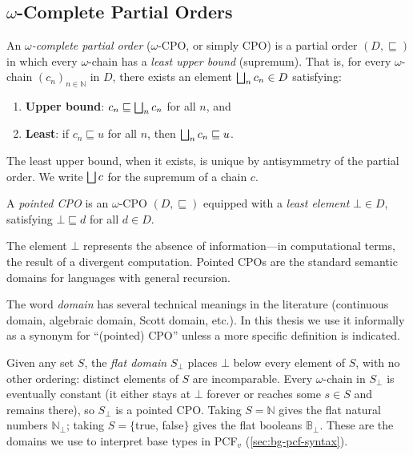 \subsection{$\omega$-Complete Partial Orders}
\label{sec:bg-cpo}

\begin{definition}
\label{def:omega-cpo}
An \emph{$\omega$-complete partial order} ($\omega$-CPO, or simply CPO)
is a partial order $(D, \sqsubseteq)$ in which every $\omega$-chain has
a \emph{least upper bound} (supremum). That is, for every $\omega$-chain
$(c_n)_{n \in \mathbb{N}}$ in $D$, there exists an element
$\bigsqcup_n c_n \in D$ satisfying:
\begin{enumerate}
  \item \textbf{Upper bound}: $c_n \sqsubseteq \bigsqcup_n c_n$ for all $n$, and
  \item \textbf{Least}: if $c_n \sqsubseteq u$ for all $n$, then
        $\bigsqcup_n c_n \sqsubseteq u$.
\end{enumerate}
\end{definition}

The least upper bound, when it exists, is unique by antisymmetry of the
partial order. We write $\bigsqcup c$ for the supremum of a chain $c$.

\begin{definition}
\label{def:pointed-cpo}
A \emph{pointed CPO} is an $\omega$-CPO $(D, \sqsubseteq)$ equipped with a
\emph{least element} $\bot \in D$, satisfying $\bot \sqsubseteq d$ for all
$d \in D$.
\end{definition}

The element $\bot$ represents the absence of information---in
computational terms, the result of a divergent computation. Pointed CPOs
are the standard semantic domains for languages with general recursion.

\begin{remark}
\label{rem:domain}
The word \emph{domain} has several technical meanings in the literature
(continuous domain, algebraic domain, Scott domain, etc.). In this thesis
we use it informally as a synonym for ``(pointed) CPO'' unless a more
specific definition is indicated.
\end{remark}

\begin{example}
\label{ex:flat-domain}
Given any set $S$, the \emph{flat domain} $S_\bot$ places $\bot$ below every
element of $S$, with no other ordering: distinct elements of $S$ are
incomparable. Every $\omega$-chain in $S_\bot$ is eventually constant (it
either stays at $\bot$ forever or reaches some $s \in S$ and remains there),
so $S_\bot$ is a pointed CPO. Taking $S = \mathbb{N}$ gives the flat natural
numbers $\mathbb{N}_\bot$; taking $S = \{$\textsf{true}, \textsf{false}$\}$
gives the flat booleans $\mathbb{B}_\bot$. These are the domains we use to
interpret base types in PCF$_v$ (\cref{sec:bg-pcf-syntax}).
\end{example}

